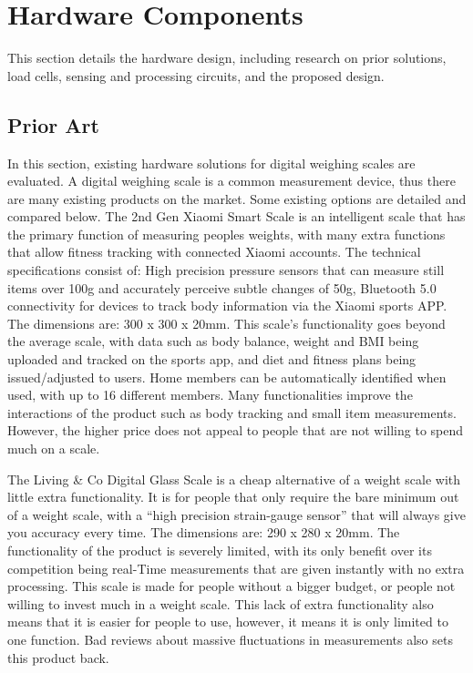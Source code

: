 
\chapter{Hardware Components}

This section details the hardware design, including research on prior solutions, load cells, sensing and processing circuits, and the proposed design.

\section{Prior Art}

In this section, existing hardware solutions for digital weighing scales are evaluated. A digital weighing scale is a common measurement device, thus there are many existing products on the market. Some existing options are detailed and compared below.
The 2nd Gen Xiaomi Smart Scale is an intelligent scale that has the primary function of measuring peoples weights, with many extra functions that allow fitness tracking with connected Xiaomi accounts. The technical specifications consist of: High precision pressure sensors that can measure still items over 100g and accurately perceive subtle changes of 50g, Bluetooth 5.0 connectivity for devices to track body information via the Xiaomi sports APP. The dimensions are: 300 x 300 x 20mm. This scale’s functionality goes beyond the average scale, with data such as body balance, weight and BMI being uploaded and tracked on the sports app, and diet and fitness plans being issued/adjusted to users. Home members can be automatically identified when used, with up to 16 different members. Many functionalities improve the interactions of the product such as body tracking and small item measurements. However, the higher price does not appeal to people that are not willing to spend much on a scale.

The Living \& Co Digital Glass Scale is a cheap alternative of a weight scale with little extra functionality. It is for people that only require the bare minimum out of a weight scale, with a “high precision strain-gauge sensor” that will always give you accuracy every time. The dimensions are: 290 x 280 x 20mm. The functionality of the product is severely limited, with its only benefit over its competition being real-Time measurements that are given instantly with no extra processing. This scale is made for people without a bigger budget, or people not willing to invest much in a weight scale. This lack of extra functionality also means that it is easier for people to use, however, it means it is only limited to one function. Bad reviews about massive fluctuations in measurements also sets this product back.

